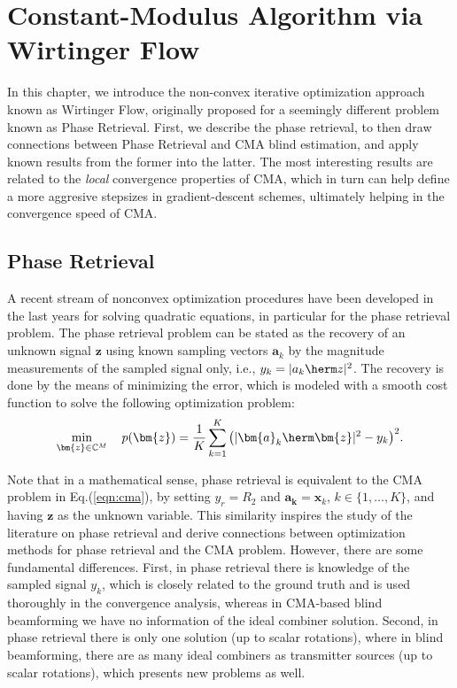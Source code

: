\chapter{Constant-Modulus Algorithm via Wirtinger Flow}
\label{chap:WF}

In this chapter, we introduce the non-convex iterative optimization approach known as Wirtinger Flow, originally proposed for a seemingly different problem known as Phase Retrieval. First, we describe the phase retrieval, to then draw connections between Phase Retrieval and CMA blind estimation, and apply known results from the former into the latter. The most interesting results are related to the \textit{local} convergence properties of CMA, which in turn can help define a more aggresive stepsizes in gradient-descent schemes, ultimately helping in the convergence speed of CMA.


\section{Phase Retrieval}
A recent stream of nonconvex optimization procedures have been developed in the last years for solving quadratic equations, in particular for the phase retrieval problem. The phase retrieval problem can be stated as the recovery of an unknown signal $\bm{z}$ using known sampling vectors $\bm{a}_k$ by the magnitude measurements of the sampled signal only, i.e., $y_k=|a_k\herm z|^2$. The recovery is done by the means of minimizing the error, which is modeled with a smooth cost function to solve the following optimization problem:
\begin{equation}
\min_{\bm{z}\in\mathbb{C}^M}\quad p(\bm{z})=\frac{1}{K}\sum_{k=1}^K\big(|\bm{a}_k\herm\bm{z}|^2-y_k\big)^2. \label{eqn:phaseretrieval}
\end{equation}

Note that in a mathematical sense, phase retrieval is equivalent to the CMA problem in Eq.(\ref{eqn:cma}), by setting $y_r=R_2$ and $\bm{a_k}=\bm{x}_k$, $k\in\{1,\ldots,K\}$, and having $\bm{z}$ as the unknown variable. This similarity inspires the study of the literature on phase retrieval and derive connections between optimization methods for phase retrieval and the CMA problem. However, there are some fundamental differences. First, in phase retrieval there is knowledge of the sampled signal $y_k$, which is closely related to the ground truth and is used thoroughly in the convergence analysis, whereas in CMA-based blind beamforming we have no information of the ideal combiner solution. Second, in phase retrieval there is only one solution (up to scalar rotations), where in blind beamforming, there are as many ideal combiners as transmitter sources (up to scalar rotations), which presents new problems as well. %

